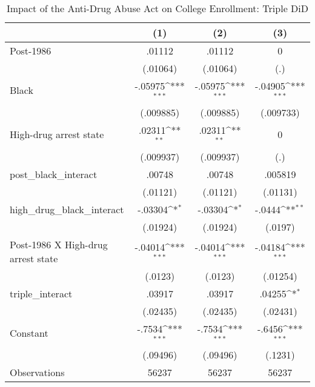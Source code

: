 \begin{table}[htbp]\centering
\def\sym#1{\ifmmode^{#1}\else\(^{#1}\)\fi}
\caption{Impact of the Anti-Drug Abuse Act on College Enrollment: Triple DiD}
\begin{tabular}{l*{3}{c}}
\hline\hline
                    &\multicolumn{1}{c}{(1)}         &\multicolumn{1}{c}{(2)}         &\multicolumn{1}{c}{(3)}         \\
\hline
Post-1986           &      .01112         &      .01112         &           0         \\
                    &    (.01064)         &    (.01064)         &         (.)         \\
[1em]
Black               &     -.05975\sym{***}&     -.05975\sym{***}&     -.04905\sym{***}\\
                    &   (.009885)         &   (.009885)         &   (.009733)         \\
[1em]
High-drug arrest state&      .02311\sym{**} &      .02311\sym{**} &           0         \\
                    &   (.009937)         &   (.009937)         &         (.)         \\
[1em]
post\_black\_interact &      .00748         &      .00748         &     .005819         \\
                    &    (.01121)         &    (.01121)         &    (.01131)         \\
[1em]
high\_drug\_black\_interact&     -.03304\sym{*}  &     -.03304\sym{*}  &      -.0444\sym{**} \\
                    &    (.01924)         &    (.01924)         &     (.0197)         \\
[1em]
Post-1986 X High-drug arrest state&     -.04014\sym{***}&     -.04014\sym{***}&     -.04184\sym{***}\\
                    &     (.0123)         &     (.0123)         &    (.01254)         \\
[1em]
triple\_interact     &      .03917         &      .03917         &      .04255\sym{*}  \\
                    &    (.02435)         &    (.02435)         &    (.02431)         \\
[1em]
Constant            &      -.7534\sym{***}&      -.7534\sym{***}&      -.6456\sym{***}\\
                    &    (.09496)         &    (.09496)         &     (.1231)         \\
\hline
Observations        &       56237         &       56237         &       56237         \\

\end{tabular}
\end{table}
